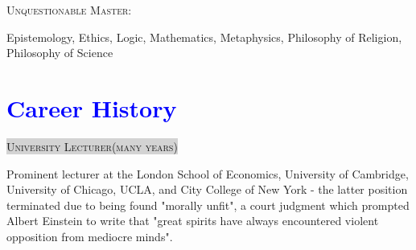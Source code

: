 \documentclass[a4paper, oneside, final]{scrartcl}
\begin{document}
\begin{center}
\begin{center}
		\begin{multicols}{2}
			\begin{flushleft}
				\textsc{Unquestionable Master:}
			\end{flushleft}
			\vspace{12em}

			Epistemology, Ethics, Logic, Mathematics, Metaphysics, Philosophy of Religion, Philosophy of Science
		\end{multicols}



    \end{center}

\section{\textcolor{blue}{Career History}} 


    \begin{flushleft}
        
        \parbox{\textwidth} {
            \colorbox{LightGrey} {
                \textsc{\small{University Lecturer}\tiny{(many years)}}
            }
        } 
        
    \end{flushleft}

    \begin{flushleft}
        \hspace{2em}
		Prominent lecturer at the London School of Economics, University of Cambridge, University of Chicago, UCLA, and City College of New York - the latter position terminated due to being found "morally unfit", a court judgment which prompted Albert Einstein to write that "great spirits have always encountered violent opposition from mediocre minds".
    \end{flushleft}

    \begin{flushleft}
        

\end{flushleft}
\end{center}
\end{document}
